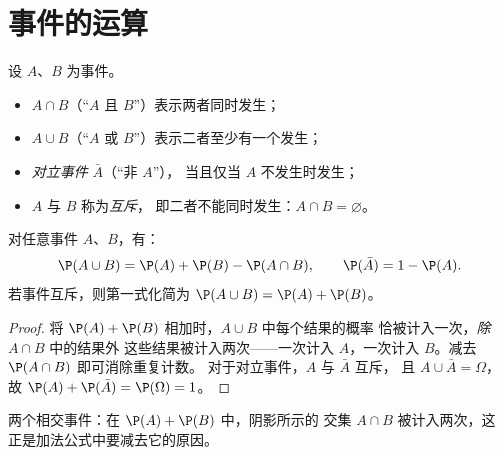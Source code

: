 \section{事件的运算}

\begin{definition}[交集、并集、对立事件]\label{def:g10:proba:operations}
设 $A$、$B$ 为事件。
\begin{itemize}
  \item $A \cap B$（“$A$ 且 $B$”）表示两者同时发生；
  \item $A \cup B$（“$A$ 或 $B$”）表示二者至少有一个发生；
  \item \emph{对立事件} $\bar A$（“非 $A$”），
        当且仅当 $A$ 不发生时发生；
  \item $A$ 与 $B$ 称为\emph{互斥}，
        即二者不能同时发生：$A \cap B = \varnothing$。
\end{itemize}
\end{definition}

\begin{theorem}[加法公式]\label{thm:g10:proba:addition}
对任意事件 $A$、$B$，有：
\[
\P(A \cup B) = \P(A) + \P(B) - \P(A \cap B),
\qquad
\P(\bar A) = 1 - \P(A) .
\]
若事件互斥，则第一式化简为
$\P(A \cup B) = \P(A) + \P(B)$。
\end{theorem}

\begin{proof}
将 $\P(A) + \P(B)$ 相加时，$A \cup B$ 中每个结果的概率
恰被计入一次，\emph{除} $A \cap B$ 中的结果外
这些结果被计入两次——一次计入 $A$，一次计入 $B$。减去 $\P(A \cap B)$ 即可消除重复计数。
对于对立事件，$A$ 与 $\bar A$ 互斥，
且 $A \cup \bar A = \Omega$，故 $\P(A) + \P(\bar A) = \P(\Omega) = 1$。
\end{proof}

\begin{omfigure}

{\small 两个相交事件：在 $\P(A) + \P(B)$ 中，阴影所示的
交集 $A \cap B$ 被计入两次，这
正是加法公式中要减去它的原因。}
\end{omfigure}

